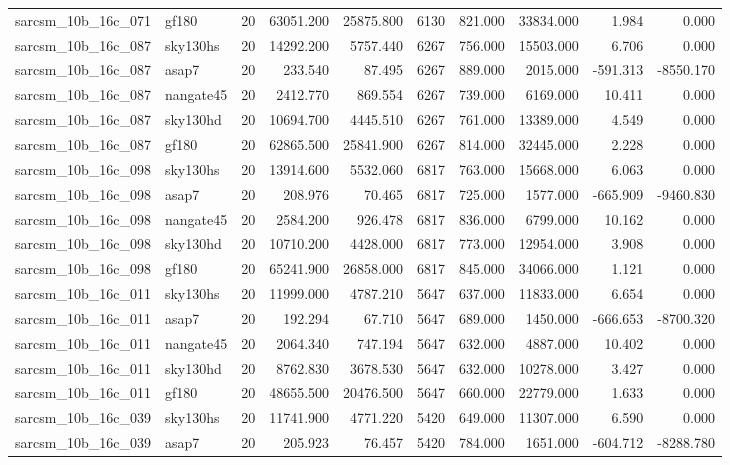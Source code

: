\begin{longtable}{llrrrrrrrr}
sarcsm\_10b\_16c\_071 & gf180 & 20 & 63051.200 & 25875.800 & 6130 & 821.000 & 33834.000 & 1.984 & 0.000 \\
sarcsm\_10b\_16c\_087 & sky130hs & 20 & 14292.200 & 5757.440 & 6267 & 756.000 & 15503.000 & 6.706 & 0.000 \\
sarcsm\_10b\_16c\_087 & asap7 & 20 & 233.540 & 87.495 & 6267 & 889.000 & 2015.000 & -591.313 & -8550.170 \\
sarcsm\_10b\_16c\_087 & nangate45 & 20 & 2412.770 & 869.554 & 6267 & 739.000 & 6169.000 & 10.411 & 0.000 \\
sarcsm\_10b\_16c\_087 & sky130hd & 20 & 10694.700 & 4445.510 & 6267 & 761.000 & 13389.000 & 4.549 & 0.000 \\
sarcsm\_10b\_16c\_087 & gf180 & 20 & 62865.500 & 25841.900 & 6267 & 814.000 & 32445.000 & 2.228 & 0.000 \\
sarcsm\_10b\_16c\_098 & sky130hs & 20 & 13914.600 & 5532.060 & 6817 & 763.000 & 15668.000 & 6.063 & 0.000 \\
sarcsm\_10b\_16c\_098 & asap7 & 20 & 208.976 & 70.465 & 6817 & 725.000 & 1577.000 & -665.909 & -9460.830 \\
sarcsm\_10b\_16c\_098 & nangate45 & 20 & 2584.200 & 926.478 & 6817 & 836.000 & 6799.000 & 10.162 & 0.000 \\
sarcsm\_10b\_16c\_098 & sky130hd & 20 & 10710.200 & 4428.000 & 6817 & 773.000 & 12954.000 & 3.908 & 0.000 \\
sarcsm\_10b\_16c\_098 & gf180 & 20 & 65241.900 & 26858.000 & 6817 & 845.000 & 34066.000 & 1.121 & 0.000 \\
sarcsm\_10b\_16c\_011 & sky130hs & 20 & 11999.000 & 4787.210 & 5647 & 637.000 & 11833.000 & 6.654 & 0.000 \\
sarcsm\_10b\_16c\_011 & asap7 & 20 & 192.294 & 67.710 & 5647 & 689.000 & 1450.000 & -666.653 & -8700.320 \\
sarcsm\_10b\_16c\_011 & nangate45 & 20 & 2064.340 & 747.194 & 5647 & 632.000 & 4887.000 & 10.402 & 0.000 \\
sarcsm\_10b\_16c\_011 & sky130hd & 20 & 8762.830 & 3678.530 & 5647 & 632.000 & 10278.000 & 3.427 & 0.000 \\
sarcsm\_10b\_16c\_011 & gf180 & 20 & 48655.500 & 20476.500 & 5647 & 660.000 & 22779.000 & 1.633 & 0.000 \\
sarcsm\_10b\_16c\_039 & sky130hs & 20 & 11741.900 & 4771.220 & 5420 & 649.000 & 11307.000 & 6.590 & 0.000 \\
sarcsm\_10b\_16c\_039 & asap7 & 20 & 205.923 & 76.457 & 5420 & 784.000 & 1651.000 & -604.712 & -8288.780 \\

\end{longtable}
